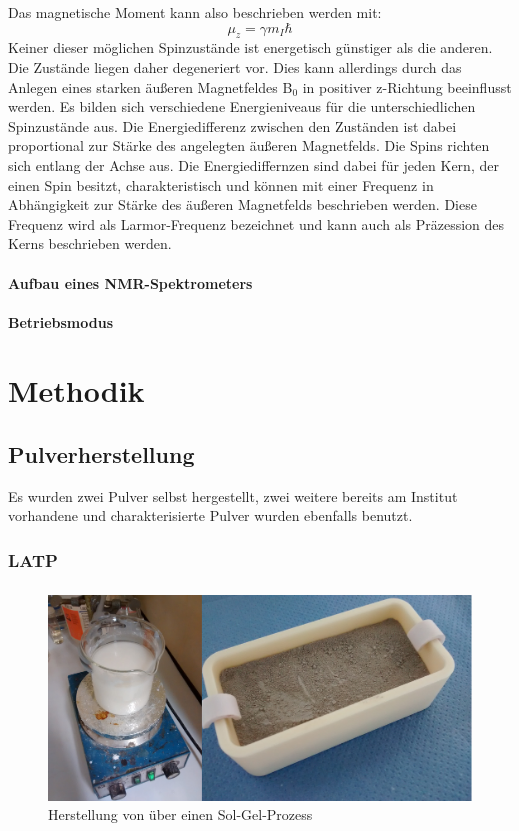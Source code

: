 \documentclass[a4paper, 11pt, headsepline,footsepline,twoside,abstract]{scrbook}
\begin{document}
Das magnetische Moment kann also beschrieben werden mit:
\begin{equation}
\mu_z = \gamma m_I \hbar
\end{equation}
Keiner dieser möglichen Spinzustände ist energetisch günstiger als die anderen. Die Zustände liegen daher degeneriert vor. Dies kann allerdings durch das Anlegen eines starken äußeren Magnetfeldes B$_0$ in positiver z-Richtung beeinflusst werden. Es bilden sich verschiedene Energieniveaus für die unterschiedlichen Spinzustände aus. Die Energiedifferenz zwischen den Zuständen ist dabei proportional zur Stärke des angelegten äußeren Magnetfelds. Die Spins richten sich entlang der Achse aus. Die Energiediffernzen sind dabei für jeden Kern, der einen Spin besitzt, charakteristisch und können mit einer Frequenz in Abhängigkeit zur Stärke des äußeren Magnetfelds beschrieben werden. Diese Frequenz wird als Larmor-Frequenz bezeichnet und kann auch als Präzession des Kerns beschrieben werden.
\subsubsection{Aufbau eines NMR-Spektrometers}
\subsubsection{Betriebsmodus}
\chapter{Methodik}

\section{Pulverherstellung}
Es wurden zwei Pulver selbst hergestellt, zwei weitere bereits am Institut vorhandene und charakterisierte Pulver wurden ebenfalls benutzt.
\subsection{LATP}
\subsection{}
\begin{figure}
	\centering
	\includegraphics[width=1.0\columnwidth]{images/SolGel.jpg}
	\caption{Herstellung von  über einen Sol-Gel-Prozess}
	\label{sol_gel}
\end{figure}
\end{document}
